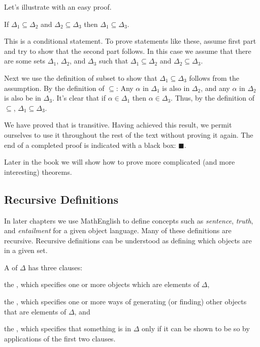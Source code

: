 Let's illustrate with an easy proof.

\begin{THEOREM}{}
	If $\Delta_1\subseteq\Delta_2$ and $\Delta_2\subseteq\Delta_3$ then $\Delta_1\subseteq\Delta_3$.
\end{THEOREM}
\begin{PROOF}
	This is a conditional statement. To prove statements like these, assume first part and try to show that the second part follows.
	In this case we assume that there are some sets $\Delta_1$, $\Delta_2$, and $\Delta_3$ such that $\Delta_1\subseteq\Delta_2$ and $\Delta_2\subseteq\Delta_3$. 
	
	Next we use the definition of subset to show that $\Delta_1\subseteq\Delta_3$ follows from the assumption. 
	By the definition of $\subseteq$: Any $\alpha$ in $\Delta_1$ is also in $\Delta_2$, and any $\alpha$ in $\Delta_2$ is also be in $\Delta_3$. 
	It's clear that if $\alpha\in\Delta_1$ then $\alpha\in\Delta_3$. 
	Thus, by the definition of $\subseteq$, $\Delta_1\subseteq\Delta_3$.
\end{PROOF}

\noindent{}We have proved that \mention{$\subseteq$} is transitive. 
Having achieved this result, we permit ourselves to use it throughout the rest of the text without proving it again. 
The end of a completed proof is indicated with a black box: $\blacksquare$.

Later in the book we will show how to prove more complicated (and more interesting) theorems.

\subsection{Recursive Definitions}\label{Recursive Definitions}

In later chapters we use MathEnglish to define concepts such as \emph{sentence}, \emph{truth}, and \emph{entailment} for a given object language. 
Many of these definitions are recursive. 
Recursive definitions can be understood as defining which objects are in a given set.

\begin{majorILnc}{}
A  of $\Delta$ has three clauses:
\begin{cenumerate}
\item the , which specifies one or more objects which are elements of $\Delta$,
\item the , which specifies one or more ways of generating (or finding) other objects that are elements of $\Delta$, and
\item the , which specifies that something is in $\Delta$ only if it can be shown to be so by applications of the first two clauses.
\end{cenumerate}
\end{majorILnc}

